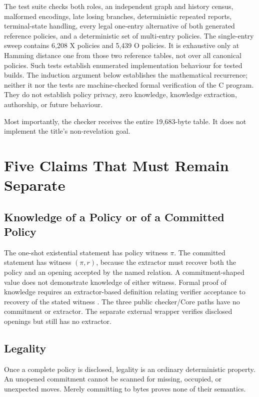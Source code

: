 The test suite checks both roles, an independent graph and history census,
malformed encodings, late losing branches, deterministic repeated reports,
terminal-state handling, every legal one-entry alternative of both generated
reference policies, and a deterministic set of multi-entry policies. The
single-entry sweep contains 6,208 X policies and 5,439 O policies. It is
exhaustive only at Hamming distance one from those two reference tables, not
over all canonical policies. Such tests establish enumerated implementation
behaviour for tested builds. The induction argument below establishes the
mathematical recurrence; neither it nor the tests are machine-checked formal
verification of the C program. They do not establish policy privacy, zero
knowledge, knowledge extraction, authorship, or future behaviour.

Most importantly, the checker receives the entire 19,683-byte table. It does
not implement the title's non-revelation goal.

\section{Five Claims That Must Remain Separate}
\label{sec:ttt-five-claims}

\subsection{Knowledge of a Policy or of a Committed Policy}

The one-shot existential statement has policy witness $\pi$. The committed
statement has witness $(\pi,r)$, because the extractor must recover both the
policy and an opening accepted by the named relation. A commitment-shaped
value does not demonstrate knowledge of either witness. Formal proof of
knowledge requires an extractor-based definition relating verifier acceptance
to recovery of the stated witness \cite{bellare1993definingknowledge}. The
three public checker/Core paths have no commitment or extractor. The separate
external wrapper verifies disclosed openings but still has no extractor.

\subsection{Legality}

Once a complete policy is disclosed, legality is an ordinary deterministic
property. An unopened commitment cannot be scanned for missing, occupied, or
unexpected moves. Merely committing to bytes proves none of their semantics.

